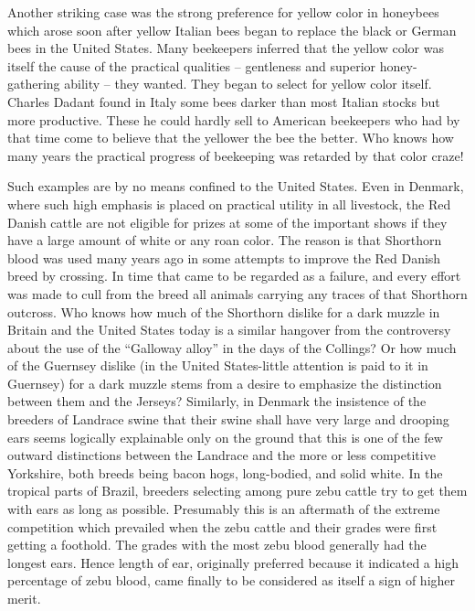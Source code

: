 Another striking case was the strong preference for yellow color in
honeybees which arose soon after yellow Italian bees began to replace
the black or German bees in the United States. Many beekeepers
inferred that the yellow color was itself the cause of the practical qualities --
gentleness and superior honey-gathering ability -- they wanted.
They began to select for yellow color itself. Charles Dadant found in
Italy some bees darker than most Italian stocks but more productive.
These he could hardly sell to American beekeepers who had by that
time come to believe that the yellower the bee the better. Who knows
how many years the practical progress of beekeeping was retarded by
that color craze!

Such examples are by no means confined to the United States. Even
in Denmark, where such high emphasis is placed on practical utility in
all livestock, the Red Danish cattle are not eligible for prizes at some of
the important shows if they have a large amount of white or any roan
color. The reason is that Shorthorn blood was used many years ago in
some attempts to improve the Red Danish breed by crossing. In time
that came to be regarded as a failure, and every effort was made to cull
from the breed all animals carrying any traces of that Shorthorn outcross.
Who knows how much of the Shorthorn dislike for a dark muzzle
in Britain and the United States today is a similar hangover from the
controversy about the use of the ``Galloway alloy'' in the days of the
Collings? Or how much of the Guernsey dislike (in the United States-little
attention is paid to it in Guernsey) for a dark muzzle stems from a
desire to emphasize the distinction between them and the Jerseys? Similarly,
in Denmark the insistence of the breeders of Landrace swine that
their swine shall have very large and drooping ears seems logically
explainable only on the ground that this is one of the few outward distinctions
between the Landrace and the more or less competitive Yorkshire,
both breeds being bacon hogs, long-bodied, and solid white. In
the tropical parts of Brazil, breeders selecting among pure zebu cattle
try to get them with ears as long as possible. Presumably this is an aftermath
of the extreme competition which prevailed when the zebu cattle
and their grades were first getting a foothold. The grades with the most
zebu blood generally had the longest ears. Hence length of ear, originally
preferred because it indicated a high percentage of zebu blood,
came finally to be considered as itself a sign of higher merit.
\noclub

